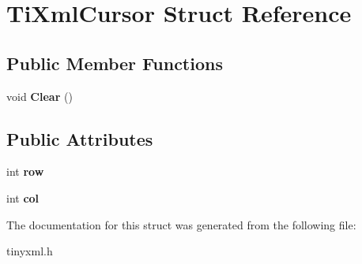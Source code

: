 \section{Ti\+Xml\+Cursor Struct Reference}
\label{structTiXmlCursor}
\subsection*{Public Member Functions}
\begin{DoxyCompactItemize}
\item 
\mbox{\label{structTiXmlCursor_a1e6fa622b59dafb71b6efe595105dcdd}} 
void {\bfseries Clear} ()
\end{DoxyCompactItemize}
\subsection*{Public Attributes}
\begin{DoxyCompactItemize}
\item 
\mbox{\label{structTiXmlCursor_a5b54dd949820c2db061e2be41f3effb3}} 
int {\bfseries row}
\item 
\mbox{\label{structTiXmlCursor_a5694d7ed2c4d20109d350c14c417969d}} 
int {\bfseries col}
\end{DoxyCompactItemize}


The documentation for this struct was generated from the following file\+:\begin{DoxyCompactItemize}
\item 
tinyxml.\+h\end{DoxyCompactItemize}
